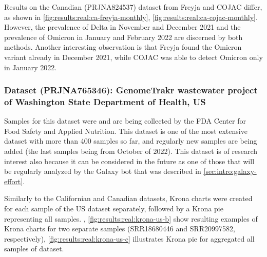     Results on the Canadian (PRJNA824537) dataset from Freyja and COJAC differ, as shown in \cref{fig:results:real:ca-freyja-monthly}, \ref{fig:results:real:ca-cojac-monthly}. However, the prevalence of Delta in November and December 2021 and the prevalence of Omicron in January and February 2022 are discerned by both methods. Another interesting observation is that Freyja found the Omicron variant already in December 2021, while COJAC was able to detect Omicron only in January 2022.
    
    \subsubsection{Dataset (PRJNA765346): GenomeTrakr wastewater project of Washington State Department of Health, US} \label{sec:results:real:us}
    Samples for this dataset were and are being collected by the FDA Center for Food Safety and Applied Nutrition. This dataset is one of the most extensive dataset with more than 400 samples so far, and regularly new samples are being added (the last samples being from October of 2022). This dataset is of research interest also because it can be considered in the future as one of those that will be regularly analyzed by the Galaxy bot that was described in \cref{sec:intro:galaxy-effort}.

    Similarly to the Californian and Canadian datasets, Krona charts were created for each sample of the US dataset separately, followed by a Krona pie representing all samples. , \ref{fig:results:real:krona-us-b} show resulting examples of Krona charts for two separate samples (SRR18680446 and SRR20997582, respectively), \cref{fig:results:real:krona-us-c} illustrates Krona pie for aggregated all samples of dataset.
    
